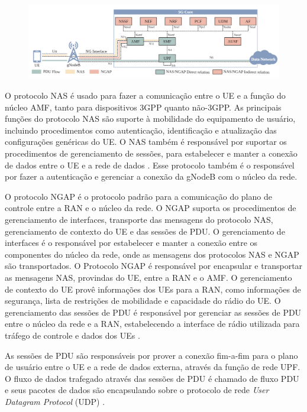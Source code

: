 \begin{figure}
    \centering
    \includegraphics[width=1\textwidth]{TG1/Images/5GSystemProtocols.png}
    \label{fig:5Gprotocols}
\end{figure}

O protocolo NAS é usado para fazer a comunicação entre o UE e a função do núcleo AMF, tanto para dispositivos 3GPP quanto não-3GPP. As principais funções do protocolo NAS são suporte à mobilidade do equipamento de usuário, incluindo procedimentos como autenticação, identificação e atualização das configurações genéricas do UE. O NAS também é responsável por suportar os procedimentos de gerenciamento de sessões, para estabelecer e manter a conexão de dados entre o UE e a rede de dados \cite{3gpp.24.501}. Esse protocolo também é o responsável por fazer a autenticação e gerenciar a conexão da gNodeB com o núcleo da rede.

O protocolo NGAP é o protocolo padrão para a comunicação do plano de controle entre a RAN e o núcleo da rede. O NGAP suporta os procedimentos de gerenciamento de interfaces, transporte das mensagens do protocolo NAS, gerenciamento de contexto do UE e das sessões de PDU. O gerenciamento de interfaces é o responsável por estabelecer e manter a conexão entre os componentes do núcleo da rede, onde as mensagens dos protocolos NAS e NGAP são transportados. O Protocolo NGAP é responsável por encapsular e transportar as mensagens NAS, provindas do UE, entre a RAN e o AMF. O gerenciamento de contexto do UE provê informações dos UEs para a RAN, como informações de segurança, lista de restrições de mobilidade e capacidade do rádio do UE. O gerenciamento das sessões de PDU é responsável por gerenciar as sessões de PDU entre o núcleo da rede e a RAN, estabelecendo a interface de rádio utilizada para tráfego de controle e dados dos UEs \cite{3gpp.38.413}.

As sessões de PDU são responsáveis por prover a conexão fim-a-fim para o plano de usuário entre o UE e a rede de dados externa, através da função de rede UPF.
O fluxo de dados trafegado através das sessões de PDU é chamado de fluxo PDU e seus pacotes de dados são encapsulando sobre o protocolo de rede \textit{User Datagram Protocol} (UDP) \cite{3gpp.38.415}.


